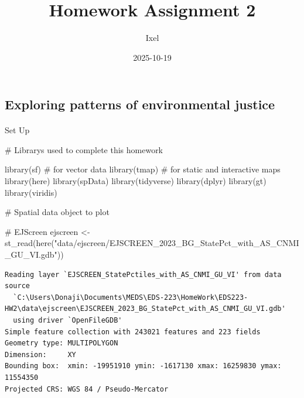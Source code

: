 \documentclass[
  letterpaper,
  DIV=11,
  numbers=noendperiod]{scrartcl}
\title{Homework Assignment 2}
\author{Ixel}
\date{2025-10-19}
\makeatletter
\let\oldparagraph\paragraph
\renewcommand{\paragraph}{
    \@ifstar
      \xxxParagraphStar
      \xxxParagraphNoStar
  }
\newcommand{\xxxParagraphStar}[1]{\oldparagraph*{#1}\mbox{}}
\newcommand{\xxxParagraphNoStar}[1]{\oldparagraph{#1}\mbox{}}
\newenvironment{Shaded}{\begin{snugshade}}{\end{snugshade}}
\newcommand{\CommentTok}[1]{\textcolor[rgb]{0.37,0.37,0.37}{#1}}
\newcommand{\FunctionTok}[1]{\textcolor[rgb]{0.28,0.35,0.67}{#1}}
\newcommand{\NormalTok}[1]{\textcolor[rgb]{0.00,0.23,0.31}{#1}}
\newcommand{\OtherTok}[1]{\textcolor[rgb]{0.00,0.23,0.31}{#1}}
\newcommand{\StringTok}[1]{\textcolor[rgb]{0.13,0.47,0.30}{#1}}
\makeatother
\begin{document}
\maketitle


\subsection{Exploring patterns of environmental
justice}\label{exploring-patterns-of-environmental-justice}

\paragraph{Set Up}\label{set-up}

\begin{Shaded}
\begin{Highlighting}[]
\CommentTok{\# Librarys used to complete this homework}

\FunctionTok{library}\NormalTok{(sf) }\CommentTok{\# for vector data }
\FunctionTok{library}\NormalTok{(tmap) }\CommentTok{\# for static and interactive maps}
\FunctionTok{library}\NormalTok{(here)}
\FunctionTok{library}\NormalTok{(spData) }
\FunctionTok{library}\NormalTok{(tidyverse)}
\FunctionTok{library}\NormalTok{(dplyr)}
\FunctionTok{library}\NormalTok{(gt)}
\FunctionTok{library}\NormalTok{(viridis)}
\end{Highlighting}
\end{Shaded}

\begin{Shaded}
\begin{Highlighting}[]
\CommentTok{\# Spatial data object to plot}

\CommentTok{\# EJScreen }
\NormalTok{ejscreen }\OtherTok{\textless{}{-}} \FunctionTok{st\_read}\NormalTok{(}\FunctionTok{here}\NormalTok{(}\StringTok{"data/ejscreen/EJSCREEN\_2023\_BG\_StatePct\_with\_AS\_CNMI\_GU\_VI.gdb"}\NormalTok{))}
\end{Highlighting}
\end{Shaded}

\begin{verbatim}
Reading layer `EJSCREEN_StatePctiles_with_AS_CNMI_GU_VI' from data source 
  `C:\Users\Donaji\Documents\MEDS\EDS-223\HomeWork\EDS223-HW2\data\ejscreen\EJSCREEN_2023_BG_StatePct_with_AS_CNMI_GU_VI.gdb' 
  using driver `OpenFileGDB'
Simple feature collection with 243021 features and 223 fields
Geometry type: MULTIPOLYGON
Dimension:     XY
Bounding box:  xmin: -19951910 ymin: -1617130 xmax: 16259830 ymax: 11554350
Projected CRS: WGS 84 / Pseudo-Mercator
\end{verbatim}
\end{document}
